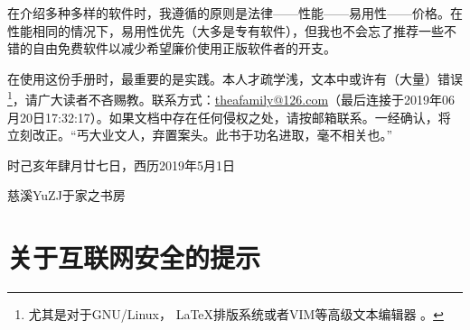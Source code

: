 \documentclass{book}
\begin{document}
在介绍多种多样的软件时，我遵循的原则是法律——性能——易用性——价格。在性能相同的情况下，易用性优先（大多是专有软件），但我也不会忘了推荐一些不错的自由免费软件以减少希望廉价使用正版软件者的开支。\par
 在使用这份手册时，最重要的是实践。本人才疏学浅，文本中或许有（大量）错误\footnote{尤其是对于GNU/Linux， \LaTeX 排版系统或者VIM等高级文本编辑器 。}，请广大读者不吝赐教。联系方式：\url{theafamily@126.com}（最后连接于2019年06月20日17:32:17）。如果文档中存在任何侵权之处，请按邮箱联系。一经确认，将立刻改正。“丐大业文人，弃置案头。此书于功名进取，毫不相关也。”\par
 时己亥年肆月廿七日，西历2019年5月1日\par
 慈溪YuZJ于家之书房
\section{关于互联网安全的提示}
\end{document}
